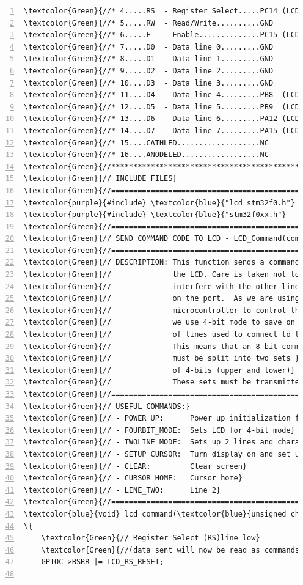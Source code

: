 \begin{Verbatim}[fontfamily=courier,fontsize=\small, numbers=left,commandchars=\\\{\}]
\textcolor{Green}{//* 4.....RS  - Register Select.....PC14 (LCD_RS) *}
\textcolor{Green}{//* 5.....RW  - Read/Write..........GND           *}
\textcolor{Green}{//* 6.....E   - Enable..............PC15 (LCD_E)  *}
\textcolor{Green}{//* 7.....D0  - Data line 0.........GND           *}
\textcolor{Green}{//* 8.....D1  - Data line 1.........GND           *}
\textcolor{Green}{//* 9.....D2  - Data line 2.........GND           *}
\textcolor{Green}{//* 10....D3  - Data line 3.........GND           *}
\textcolor{Green}{//* 11....D4  - Data line 4.........PB8  (LCD_D4) *}
\textcolor{Green}{//* 12....D5  - Data line 5.........PB9  (LCD_D5) *}
\textcolor{Green}{//* 13....D6  - Data line 6.........PA12 (LCD_D6) *}
\textcolor{Green}{//* 14....D7  - Data line 7.........PA15 (LCD_D7) *}
\textcolor{Green}{//* 15....CATHLED...................NC            *}
\textcolor{Green}{//* 16....ANODELED..................NC            *}
\textcolor{Green}{//*************************************************}
\textcolor{Green}{// INCLUDE FILES}
\textcolor{Green}{//=================================================}
\textcolor{purple}{#include} \textcolor{blue}{"lcd_stm32f0.h"}   
\textcolor{purple}{#include} \textcolor{blue}{"stm32f0xx.h"} 
\textcolor{Green}{//=================================================}
\textcolor{Green}{// SEND COMMAND CODE TO LCD - LCD_Command(command)}
\textcolor{Green}{//=================================================}
\textcolor{Green}{// DESCRIPTION: This function sends a command to }
\textcolor{Green}{//              the LCD. Care is taken not to }
\textcolor{Green}{//              interfere with the other lines }
\textcolor{Green}{//              on the port.  As we are using a}
\textcolor{Green}{//              microcontroller to control the LCD}
\textcolor{Green}{//              we use 4-bit mode to save on number}
\textcolor{Green}{//              of lines used to connect to the LCD. }
\textcolor{Green}{//              This means that an 8-bit command}
\textcolor{Green}{//              must be split into two sets }
\textcolor{Green}{//              of 4-bits (upper and lower)}
\textcolor{Green}{//              These sets must be transmitted}
\textcolor{Green}{//=================================================}
\textcolor{Green}{// USEFUL COMMANDS:}
\textcolor{Green}{// - POWER_UP:      Power up initialization for the lcd}
\textcolor{Green}{// - FOURBIT_MODE:  Sets LCD for 4-bit mode}
\textcolor{Green}{// - TWOLINE_MODE:  Sets up 2 lines and character size}
\textcolor{Green}{// - SETUP_CURSOR:  Turn display on and set up cursor}
\textcolor{Green}{// - CLEAR:         Clear screen}
\textcolor{Green}{// - CURSOR_HOME:   Cursor home}
\textcolor{Green}{// - LINE_TWO:      Line 2}
\textcolor{Green}{//=================================================}
\textcolor{blue}{void} lcd_command(\textcolor{blue}{unsigned char} command)
\{
	\textcolor{Green}{// Register Select (RS)line low} 
	\textcolor{Green}{//(data sent will now be read as commands)}
	GPIOC->BSRR |= LCD_RS_RESET;
    			  

\end{Verbatim}
